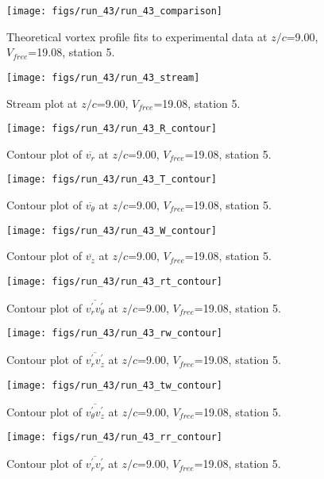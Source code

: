 \begin{figure}[H]
\centering
\texttt{[image: figs/run\_43/run\_43\_comparison]}
\caption{Theoretical vortex profile fits to experimental data at $z/c$=9.00, $V_{free}$=19.08, station 5.}
\end{figure}


\begin{figure}[H]
\centering
\texttt{[image: figs/run\_43/run\_43\_stream]}
\caption{Stream plot at $z/c$=9.00, $V_{free}$=19.08, station 5.}
\end{figure}


\begin{figure}[H]
\centering
\texttt{[image: figs/run\_43/run\_43\_R\_contour]}
\caption{Contour plot of $\overline{v_{r}}$ at $z/c$=9.00, $V_{free}$=19.08, station 5.}
\end{figure}


\begin{figure}[H]
\centering
\texttt{[image: figs/run\_43/run\_43\_T\_contour]}
\caption{Contour plot of $\overline{v_{\theta}}$ at $z/c$=9.00, $V_{free}$=19.08, station 5.}
\end{figure}


\begin{figure}[H]
\centering
\texttt{[image: figs/run\_43/run\_43\_W\_contour]}
\caption{Contour plot of $\overline{v_{z}}$ at $z/c$=9.00, $V_{free}$=19.08, station 5.}
\end{figure}


\begin{figure}[H]
\centering
\texttt{[image: figs/run\_43/run\_43\_rt\_contour]}
\caption{Contour plot of $\overline{v_{r}^{\prime} v_{\theta}^{\prime}}$ at $z/c$=9.00, $V_{free}$=19.08, station 5.}
\end{figure}


\begin{figure}[H]
\centering
\texttt{[image: figs/run\_43/run\_43\_rw\_contour]}
\caption{Contour plot of $\overline{v_{r}^{\prime} v_{z}^{\prime}}$ at $z/c$=9.00, $V_{free}$=19.08, station 5.}
\end{figure}


\begin{figure}[H]
\centering
\texttt{[image: figs/run\_43/run\_43\_tw\_contour]}
\caption{Contour plot of $\overline{v_{\theta}^{\prime} v_{z}^{\prime}}$ at $z/c$=9.00, $V_{free}$=19.08, station 5.}
\end{figure}


\begin{figure}[H]
\centering
\texttt{[image: figs/run\_43/run\_43\_rr\_contour]}
\caption{Contour plot of $\overline{v_{r}^{\prime} v_{r}^{\prime}}$ at $z/c$=9.00, $V_{free}$=19.08, station 5.}
\end{figure}


